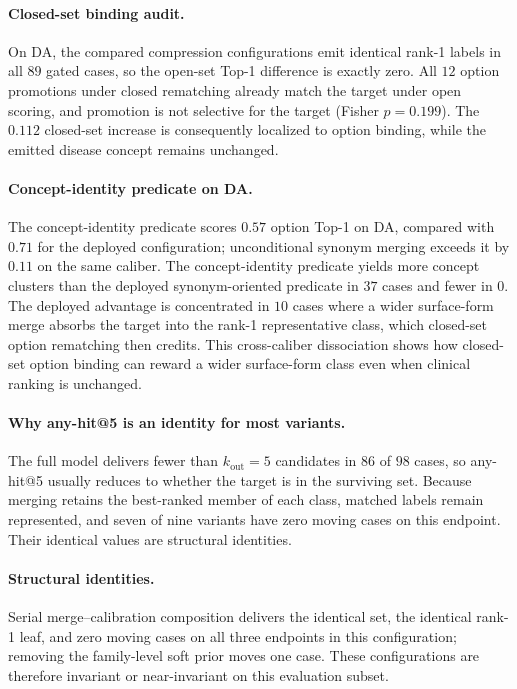 \documentclass[letterpaper]{article}
\begin{document}
\paragraph{Closed-set binding audit.}
On DA, the compared compression configurations emit identical rank-1 labels in all $89$ gated cases, so the open-set Top-1 difference is exactly zero.
All $12$ option promotions under closed rematching already match the target under open scoring, and promotion is not selective for the target (Fisher $p=0.199$).
The $0.112$ closed-set increase is consequently localized to option binding, while the emitted disease concept remains unchanged.

\paragraph{Concept-identity predicate on DA.}
The concept-identity predicate scores $0.57$ option Top-1 on DA, compared with $0.71$ for the deployed configuration; unconditional synonym merging exceeds it by $0.11$ on the same caliber.
The concept-identity predicate yields more concept clusters than the deployed synonym-oriented predicate in $37$ cases and fewer in $0$.
The deployed advantage is concentrated in $10$ cases where a wider surface-form merge absorbs the target into the rank-1 representative class, which closed-set option rematching then credits.
This cross-caliber dissociation shows how closed-set option binding can reward a wider surface-form class even when clinical ranking is unchanged.

\paragraph{Why any-hit@5 is an identity for most variants.}
The full model delivers fewer than $k_{\mathrm{out}}{=}5$ candidates in $86$ of $98$ cases, so any-hit@5 usually reduces to whether the target is in the surviving set.
Because merging retains the best-ranked member of each class, matched labels remain represented, and seven of nine variants have zero moving cases on this endpoint.
Their identical values are structural identities.

\paragraph{Structural identities.}
Serial merge--calibration composition delivers the identical set, the identical rank-1 leaf, and zero moving cases on all three endpoints in this configuration; removing the family-level soft prior moves one case.
These configurations are therefore invariant or near-invariant on this evaluation subset.
\end{document}
